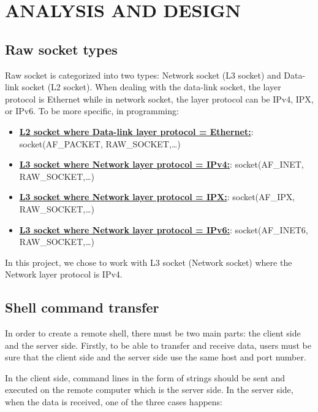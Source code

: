 \newpage
\vspace{6cm}
\section{ANALYSIS AND DESIGN}
\subsection{Raw socket types}
\hspace{0.7cm}Raw socket is categorized into two types: Network socket (L3 socket) and Data-link socket (L2 socket).  When dealing with the data-link socket, the layer protocol is Ethernet while in network socket, the layer protocol can be IPv4, IPX, or IPv6. To be more specific, in programming:

\begin{itemize}
    \item \underline{\textbf{L2 socket where Data-link layer protocol = Ethernet:}}: \newline socket(AF\_PACKET, RAW\_SOCKET,…) 
    \item \underline{\textbf{L3 socket where Network layer protocol = IPv4:}}: \newline socket(AF\_INET, RAW\_SOCKET,…) 
    \item \underline{\textbf{L3 socket where Network layer protocol = IPX:}}: \newline socket(AF\_IPX, RAW\_SOCKET,…) 
    \item \underline{\textbf{L3 socket where Network layer protocol = IPv6:}}: \newline socket(AF\_INET6, RAW\_SOCKET,…) 
\end{itemize}

\hspace{0.7cm}In this project, we chose to work with L3 socket (Network socket) where the Network layer protocol is IPv4.

\subsection{Shell command transfer}
\hspace{0.7cm}In order to create a remote shell, there must be two main parts: the client side and the server side. Firstly, to be able to transfer and receive data, users must be sure that the client side and the server side use the same host and port number.

\vspace{0.7cm}In the client side, command lines in the form of strings should be sent and executed on the remote computer which is the server side. In the server side, when the data is received, one of the three cases happens:

